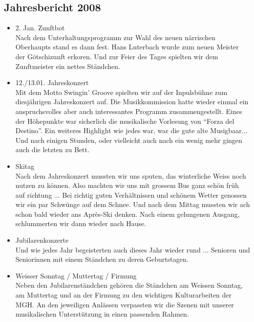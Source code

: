 \subsection{Jahresbericht 2008}

\begin{history}


    \begin{itemize}

        \item[]2. Jan. Zunftbot\\
        Nach dem Unterhaltungsprogramm zur Wahl des neuen närrischen Oberhaupts
        stand es dann fest. Hans Luterbach wurde zum neuen Meister der
        Götschizunft erkoren. Und zur Feier des Tages spielten wir dem
        Zunftmeister ein nettes Ständchen.

        \item[]12./13.01. Jahreskonzert\\

        Mit dem Motto Swingin' Groove spielten wir auf der Inpulsbühne zum
        diesjährigen Jahreskonzert auf. Die Musikkommission hatte wieder einmal
        ein anspruchsvolles aber auch interessantes Programm zusammengestellt.
        Eines der Höhepunkte war sicherlich die musikalische Vorlesung von
        \enquote{Forza del Destino}. Ein weiteres Highlight wie jedes war, war
        die gute alte Musigbaar... Und nach einigen Stunden, oder vielleicht
        auch nach ein wenig mehr gingen auch die letzten zu Bett.

        \item[]Skitag\\
        Nach dem Jahreskonzert mussten wir uns sputen, das winterliche Weiss
        noch nutzen zu können. Also machten wir uns mit grossem Bus ganz schön
        früh auf richtung ... Bei richtig guten Verhältnissen und schönem Wetter
        genossen wir ein par Schwünge auf dem Schnee. Und nach dem Mittag
        mussten wir ach schon bald wieder ans Après-Ski denken. Nach einem
        gelungenen Ausgang, schlummerten wir dann wieder nach Hause.

        \item[]Jubilarenkonzerte\\
        Und wie jedes Jahr begeisterten auch dieses Jahr wieder rund ...
        Senioren und Seniorinnen mit einem Ständchen zu deren Geburtstagen.

        \item[]Weisser Sonntag / Muttertag / Firmung\\
        Neben den Jubilarenständchen gehören die Ständchen am Weissen Sonntag,
        am Muttertag und an der Firmung zu den wichtigen Kulturarbeiten der MGH.
        An den jeweiligen Anlässen verpassten wir die Szenen mit unserer
        musikalischen Unterstützung in einen passenden Rahmen.


\end{itemize}
\end{history}
